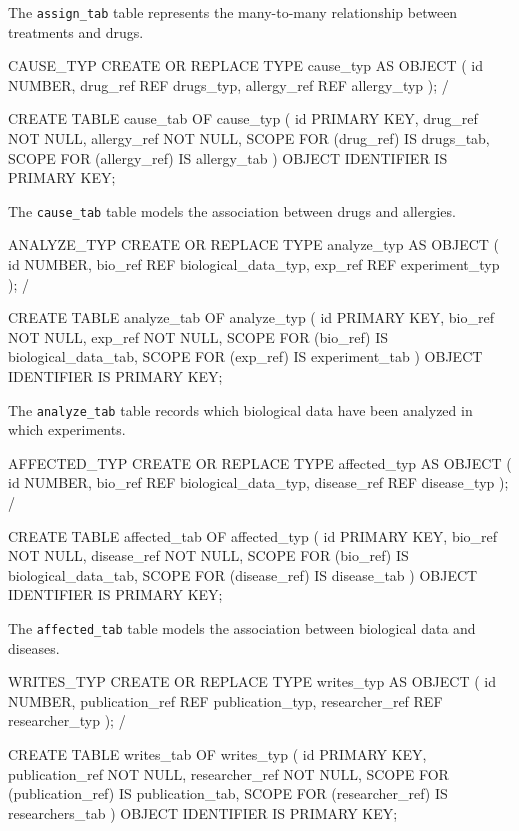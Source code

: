 \documentclass[11pt,a4paper]{article}
\begin{document}
The \texttt{assign\_tab} table represents the many-to-many relationship between treatments and drugs.

\begin{sqlbox}{CAUSE\_TYP}
CREATE OR REPLACE TYPE cause_typ AS OBJECT (
  id           NUMBER,
  drug_ref     REF drugs_typ,
  allergy_ref  REF allergy_typ
);
/

CREATE TABLE cause_tab OF cause_typ (
  id PRIMARY KEY,
  drug_ref NOT NULL,
  allergy_ref NOT NULL,
  SCOPE FOR (drug_ref) IS drugs_tab,
  SCOPE FOR (allergy_ref) IS allergy_tab
) OBJECT IDENTIFIER IS PRIMARY KEY;
\end{sqlbox}

The \texttt{cause\_tab} table models the association between drugs and allergies.

\begin{sqlbox}{ANALYZE\_TYP}
CREATE OR REPLACE TYPE analyze_typ AS OBJECT (
  id        NUMBER,
  bio_ref   REF biological_data_typ,
  exp_ref   REF experiment_typ
);
/

CREATE TABLE analyze_tab OF analyze_typ (
  id PRIMARY KEY,
  bio_ref NOT NULL,
  exp_ref NOT NULL,
  SCOPE FOR (bio_ref) IS biological_data_tab,
  SCOPE FOR (exp_ref) IS experiment_tab
) OBJECT IDENTIFIER IS PRIMARY KEY;
\end{sqlbox}

The \texttt{analyze\_tab} table records which biological data have been analyzed in which experiments.

\begin{sqlbox}{AFFECTED\_TYP}
CREATE OR REPLACE TYPE affected_typ AS OBJECT (
  id           NUMBER,
  bio_ref      REF biological_data_typ,
  disease_ref  REF disease_typ
);
/

CREATE TABLE affected_tab OF affected_typ (
  id PRIMARY KEY,
  bio_ref NOT NULL,
  disease_ref NOT NULL,
  SCOPE FOR (bio_ref) IS biological_data_tab,
  SCOPE FOR (disease_ref) IS disease_tab
) OBJECT IDENTIFIER IS PRIMARY KEY;
\end{sqlbox}

The \texttt{affected\_tab} table models the association between biological data and diseases.

\begin{sqlbox}{WRITES\_TYP}
CREATE OR REPLACE TYPE writes_typ AS OBJECT (
  id               NUMBER,
  publication_ref  REF publication_typ,
  researcher_ref   REF researcher_typ
);
/

CREATE TABLE writes_tab OF writes_typ (
  id PRIMARY KEY,
  publication_ref NOT NULL,
  researcher_ref NOT NULL,
  SCOPE FOR (publication_ref) IS publication_tab,
  SCOPE FOR (researcher_ref) IS researchers_tab
) OBJECT IDENTIFIER IS PRIMARY KEY;
\end{sqlbox}
\end{document}
